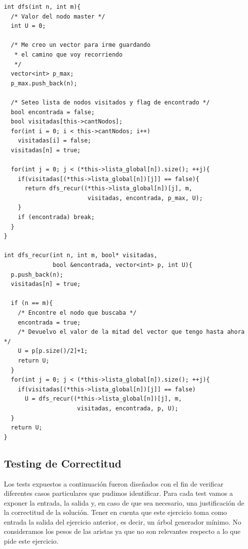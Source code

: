 \begin{lstlisting}
int dfs(int n, int m){
  /* Valor del nodo master */ 
  int U = 0;
  
  /* Me creo un vector para irme guardando 
   * el camino que voy recorriendo 
   */
  vector<int> p_max;
  p_max.push_back(n);
  
  /* Seteo lista de nodos visitados y flag de encontrado */
  bool encontrada = false;
  bool visitadas[this->cantNodos];
  for(int i = 0; i < this->cantNodos; i++)
    visitadas[i] = false;
  visitadas[n] = true;
   
  for(int j = 0; j < (*this->lista_global[n]).size(); ++j){
    if(visitadas[(*this->lista_global[n])[j]] == false){
      return dfs_recur((*this->lista_global[n])[j], m, 
                        visitadas, encontrada, p_max, U);
    }
    if (encontrada) break;
  }
}

int dfs_recur(int n, int m, bool* visitadas, 
              bool &encontrada, vector<int> p, int U){
  p.push_back(n);
  visitadas[n] = true;
  
  if (n == m){
    /* Encontre el nodo que buscaba */
    encontrada = true;
    /* Devuelvo el valor de la mitad del vector que tengo hasta ahora */
    U = p[p.size()/2]+1;
    return U;
  }
  for(int j = 0; j < (*this->lista_global[n]).size(); ++j){
    if(visitadas[(*this->lista_global[n])[j]] == false)
      U = dfs_recur((*this->lista_global[n])[j], m, 
                     visitadas, encontrada, p, U);
  }
  return U;
}
\end{lstlisting}



\newpage
\subsection{Testing de Correctitud}

Los tests expuestos a continuación fueron diseñados con el fin de verificar diferentes casos particulares que pudimos identificar. Para cada test vamos a exponer la entrada, la salida y, en caso de que sea necesario, una justificaci\'on de la correctitud de la soluci\'on. Tener en cuenta que este ejercicio toma como entrada la salida del ejercicio anterior, es decir, un árbol generador mínimo. No consideramos los pesos de las aristas ya que no son relevantes respecto a lo que pide este ejercicio.\\

\begin{figure}[H]
\centering
\def\svgwidth{340 pt}

\end{figure}

